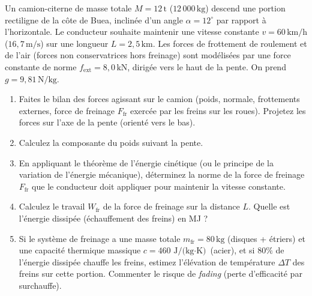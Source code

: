 \documentclass[11pt]{article}
\begin{document}
\begin{exercice}
\label{exo:probatoire_camion}
Un camion-citerne de masse totale $M = 12\,\text{t}$ ($12\,000\,\text{kg}$) descend une portion rectiligne de la côte de Buea, inclinée d'un angle $\alpha = 12^\circ$ par rapport à l'horizontale. Le conducteur souhaite maintenir une vitesse constante $v = 60\,\text{km/h}$ ($16,7\,\text{m/s}$) sur une longueur $L = 2,5\,\text{km}$. Les forces de frottement de roulement et de l'air (forces non conservatrices hors freinage) sont modélisées par une force constante de norme $f_{\text{ext}} = 8,0\,\text{kN}$, dirigée vers le haut de la pente. On prend $g = 9,81\,\text{N/kg}$.
\begin{enumerate}
    \item Faites le bilan des forces agissant sur le camion (poids, normale, frottements externes, force de freinage $F_{\text{fr}}$ exercée par les freins sur les roues). Projetez les forces sur l'axe de la pente (orienté vers le bas).
    \item Calculez la composante du poids suivant la pente.
    \item En appliquant le théorème de l'énergie cinétique (ou le principe de la variation de l'énergie mécanique), déterminez la norme de la force de freinage $F_{\text{fr}}$ que le conducteur doit appliquer pour maintenir la vitesse constante.
    \item Calculez le travail $W_{\text{fr}}$ de la force de freinage sur la distance $L$. Quelle est l'énergie dissipée (échauffement des freins) en MJ ?
    \item Si le système de freinage a une masse totale $m_{\text{fr}} = 80\,\text{kg}$ (disques + étriers) et une capacité thermique massique $c = 460\,\text{J/(kg$\cdot$K)}$ (acier), et si $80\%$ de l'énergie dissipée chauffe les freins, estimez l'élévation de température $\Delta T$ des freins sur cette portion. Commenter le risque de \emph{fading} (perte d'efficacité par surchauffe).
\end{enumerate}
\end{exercice}
\end{document}
